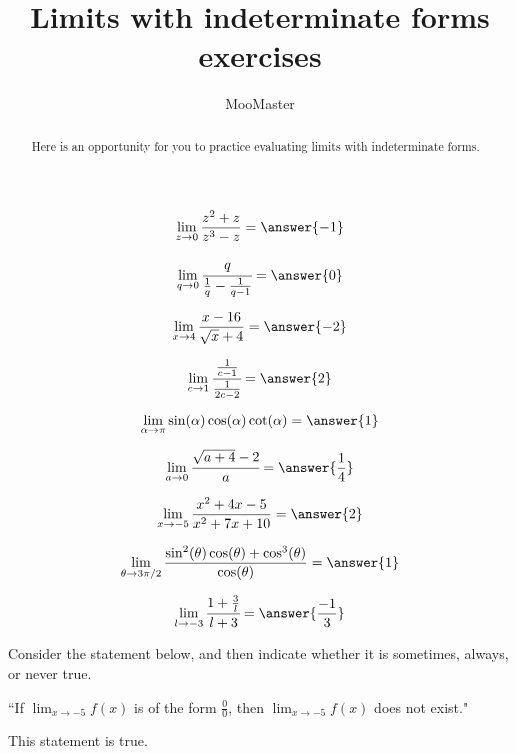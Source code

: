 \documentclass[handout]{ximera}
\title{Limits with indeterminate forms exercises}
\author{MooMaster}
\begin{document}
\begin{abstract}
Here is an opportunity for you to practice evaluating limits with indeterminate forms. 
\end{abstract}
\maketitle

\begin{exercise}
\[\lim_{z \to 0} \frac{z^2+z}{z^3-z} = \answer{-1}\]
\end{exercise}

\begin{exercise}
\[\lim_{q \to 0} \cfrac{q}{\frac{1}{q} - \frac{1}{q-1}} = \answer{0}\]
\end{exercise}

\begin{exercise}
\[\lim_{x \to 4} \frac{x-16}{\sqrt{x} + 4} = \answer{-2}\]
\end{exercise}

\begin{exercise}
\[\lim_{c \to 1} \cfrac{\frac{1}{c-1}}{\frac{1}{2c-2}} = \answer{2}\]
\end{exercise}

\begin{exercise}
\[\lim_{\alpha \to \pi} \sin(\alpha) \cos(\alpha) \cot(\alpha) = \answer{1}\]
\end{exercise}

\begin{exercise}
\[\lim_{a \to 0} \cfrac{\sqrt{a+4} -2}{a} = \answer{\frac{1}{4}}\]
\end{exercise}

\begin{exercise}
\[\lim_{x \to -5} \frac{x^2 + 4x -5}{x^2 + 7x + 10} = \answer{2}\]
\end{exercise}

\begin{exercise}
\[\displaystyle\lim_{\theta \to 3\pi /2}\frac{\sin^2(\theta)\cos(\theta) + \cos^3(\theta)}{\cos(\theta)} = \answer{1}\]
\end{exercise}

\begin{exercise}
\[\lim_{l \to -3} \cfrac{1+\frac{3}{l}}{l+3} = \answer{\frac{-1}{3}}\]
\end{exercise}

\begin{exercise}

Consider the statement below, and then indicate whether it is sometimes, always, or never true.

\begin{center} ``If $\displaystyle\lim_{x \to -5} f(x)$ is of the form $\frac{0}{0}$, then $\displaystyle\lim_{x\to -5} f(x)$ does not exist." \end{center}

This statement is  true.

\end{exercise}
\end{document}
